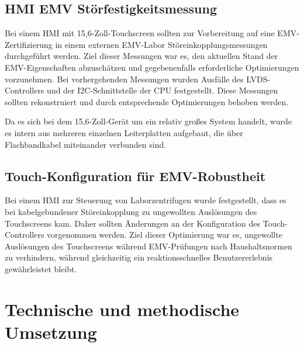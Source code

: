 \documentclass[praktikum,german]{hgbthesis}
\begin{document}
\section{HMI EMV Störfestigkeitsmessung}
Bei einem HMI mit 15,6-Zoll-Touchscreen sollten zur Vorbereitung auf eine EMV-Zertifizierung in einem externen EMV-Labor Störeinkopplungsmessungen durchgeführt werden. Ziel dieser Messungen war es, den aktuellen Stand der EMV-Eigenschaften abzuschätzen und gegebenenfalls erforderliche Optimierungen vorzunehmen. Bei vorhergehenden Messungen wurden Ausfälle des LVDS-Controllers und der I2C-Schnittstelle der CPU festgestellt. Diese Messungen sollten rekonstruiert und durch entsprechende Optimierungen behoben werden.

Da es sich bei dem 15,6-Zoll-Gerät um ein relativ großes System handelt, wurde es intern aus mehreren einzelnen Leiterplatten aufgebaut, die über Flachbandkabel miteinander verbunden sind.

\section{Touch-Konfiguration für EMV-Robustheit}
Bei einem HMI zur Steuerung von Laborzentrifugen wurde festgestellt, dass es bei kabelgebundener Störeinkopplung zu ungewollten Auslösungen des Touchscreens kam. Daher sollten Änderungen an der Konfiguration des Touch-Controllers vorgenommen werden. Ziel dieser Optimierung war es, ungewollte Auslösungen des Touchscreens während EMV-Prüfungen nach Haushaltsnormen zu verhindern, während gleichzeitig ein reaktionsschnelles Benutzererlebnis gewährleistet bleibt.

\chapter{Technische und methodische Umsetzung}

\end{document}

